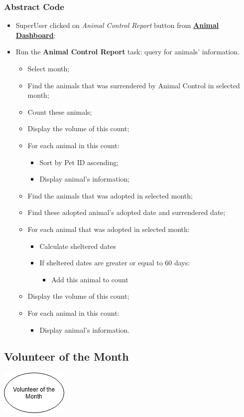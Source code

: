 \documentclass[a4paper]{article}
\begin{document}
\subsubsection{Abstract Code}

\begin{itemize}
	\item SuperUser clicked on \textit{Animal Control Report} button from \underline{\textbf{Animal Dashboard}}:
	\item Run the \textbf{Animal Control Report} task: query for animals' information.
	\begin{itemize}
		\item Select month;
		\item Find the animals that was surrendered by Animal Control in selected month;
		\item Count these animals;
		\item Display the volume of this count;
		\item For each animal in this count:
		\begin{itemize}
			\item Sort by Pet ID ascending;
			\item Display animal's information;
		\end{itemize}
		\item Find the animals that was adopted in selected month;
		\item Find these adopted animal's adopted date and surrendered date;
		\item For each animal that was adopted in selected month:
		\begin{itemize}
			\item Calculate sheltered dates
			\item If sheltered dates are greater or equal to 60 days:
			\begin{itemize}
				\item Add this animal to count
			\end{itemize}
		\end{itemize}
		\item Display the volume of this count;
		\item For each animal in this count:
		\begin{itemize}
			\item Display animal's information.
		\end{itemize}
	\end{itemize}
\end{itemize}

\hypertarget{volunteer_of_the_month}{\subsection{Volunteer of the Month}}
\includegraphics[scale = 0.6]{volunteer_of_the_month.png}
\end{document}
